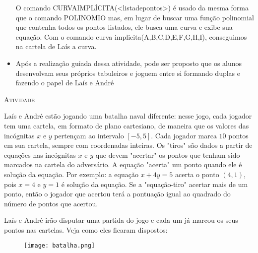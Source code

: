 \documentclass[10 pt,usenames,dvipsnames, oneside]{article}
\begin{document}
\begin{goals}
\begin{itemize}
O comando CURVAIMPLÍCITA(<listadepontos>) é usado da mesma forma que o comando POLINOMIO mas, em lugar de buscar uma função polinomial que contenha todos os pontos listados, ele busca uma curva e exibe sua equação. Com o comando curva implicita(A,B,C,D,E,F,G,H,I), conseguimos na cartela de Laís a curva.
\item Após a realização guiada dessa atividade, pode ser proposto que os alunos desenvolvam seus próprios tabuleiros e joguem entre si formando duplas e fazendo o papel de Laís e André
\end{itemize}
\end{goals}

\bigskip
\begin{center}
{\large \scshape Atividade}
\end{center}
\fi

Laís e André estão jogando uma batalha naval diferente: nesse jogo, cada jogador tem uma cartela, em formato de plano cartesiano, de maneira que os valores das incógnitas $x$ e $y$ pertençam ao intervalo $[-5,5]$. Cada jogador marca $10$ pontos em sua cartela, sempre com coordenadas inteiras. Os "tiros"{} são dados a partir de equações nas incógnitas $x$ e $y$ que devem "acertar"{} os pontos que tenham sido marcados na cartela do adversário. A equação "acerta"{} um ponto quando ele é solução da equação. Por exemplo: a equação $x+4y=5$ acerta o ponto $(4,1)$, pois $x = 4$ e $y = 1$ é solução da equação. Se a "equação-tiro"{} acertar mais de um ponto, então o jogador que acertou terá a pontuação igual ao quadrado do número de pontos que acertou.

Laís e André irão disputar uma partida do jogo e cada um já marcou os seus pontos nas cartelas. Veja como eles ficaram dispostos:

\begin{figure}[H]
\centering

\noindent\texttt{[image: batalha.png]}
\end{figure}
\end{document}
